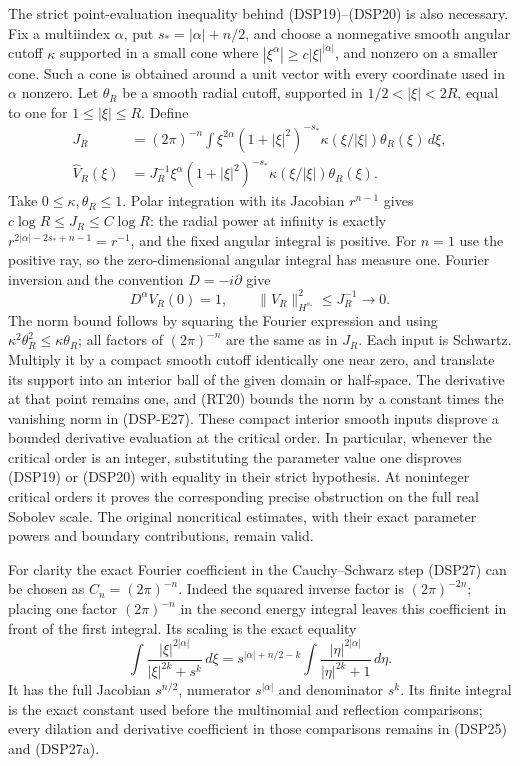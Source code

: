 \documentclass[
  11pt,
]{article}
\begin{document}
The strict point-evaluation inequality behind (DSP19)--(DSP20) is also
necessary. Fix a multiindex \(\alpha\), put \(s_*=|\alpha|+n/2\), and
choose a nonnegative smooth angular cutoff \(\kappa\) supported in a
small cone where \(|\xi^\alpha|\geq c|\xi|^{|\alpha|}\), and nonzero on
a smaller cone. Such a cone is obtained around a unit vector with every
coordinate used in \(\alpha\) nonzero. Let \(\theta_R\) be a smooth
radial cutoff, supported in \(1/2<|\xi|<2R\), equal to one for
\(1\leq|\xi|\leq R\). Define \[
 \begin{split}
 J_R&=(2\pi)^{-n}\int \xi^{2\alpha}(1+|\xi|^2)^{-s_*}
                   \kappa(\xi/|\xi|)\theta_R(\xi)\,d\xi,\\
 \widehat V_R(\xi)&=J_R^{-1}\xi^\alpha(1+|\xi|^2)^{-s_*}
                    \kappa(\xi/|\xi|)\theta_R(\xi).
 \end{split}\tag{DSP-E26}
\] Take \(0\leq\kappa,\theta_R\leq1\). Polar integration with its
Jacobian \(r^{n-1}\) gives \(c\log R\leq J_R\leq C\log R\): the radial
power at infinity is exactly \(r^{2|\alpha|-2s_*+n-1}=r^{-1}\), and the
fixed angular integral is positive. For \(n=1\) use the positive ray, so
the zero-dimensional angular integral has measure one. Fourier inversion
and the convention \(D=-i\partial\) give \[
 D^\alpha V_R(0)=1,\qquad
 \|V_R\|_{H^{s_*}}^2
 \leq J_R^{-1}\longrightarrow0.
 \tag{DSP-E27}
\] The norm bound follows by squaring the Fourier expression and using
\(\kappa^2\theta_R^2\leq\kappa\theta_R\); all factors of \((2\pi)^{-n}\)
are the same as in \(J_R\). Each input is Schwartz. Multiply it by a
compact smooth cutoff identically one near zero, and translate its
support into an interior ball of the given domain or half-space. The
derivative at that point remains one, and (RT20) bounds the norm by a
constant times the vanishing norm in (DSP-E27). These compact interior
smooth inputs disprove a bounded derivative evaluation at the critical
order. In particular, whenever the critical order is an integer,
substituting the parameter value one disproves (DSP19) or (DSP20) with
equality in their strict hypothesis. At noninteger critical orders it
proves the corresponding precise obstruction on the full real Sobolev
scale. The original noncritical estimates, with their exact parameter
powers and boundary contributions, remain valid.

For clarity the exact Fourier coefficient in the Cauchy--Schwarz step
(DSP27) can be chosen as \(C_n=(2\pi)^{-n}\). Indeed the squared inverse
factor is \((2\pi)^{-2n}\); placing one factor \((2\pi)^{-n}\) in the
second energy integral leaves this coefficient in front of the first
integral. Its scaling is the exact equality \[
 \int\frac{|\xi|^{2|\alpha|}}{|\xi|^{2k}+s^k}\,d\xi
 =s^{|\alpha|+n/2-k}
       \int\frac{|\eta|^{2|\alpha|}}{|\eta|^{2k}+1}\,d\eta.
 \tag{DSP-E28}
\] It has the full Jacobian \(s^{n/2}\), numerator \(s^{|\alpha|}\) and
denominator \(s^k\). Its finite integral is the exact constant used
before the multinomial and reflection comparisons; every dilation and
derivative coefficient in those comparisons remains in (DSP25) and
(DSP27a).
\end{document}
